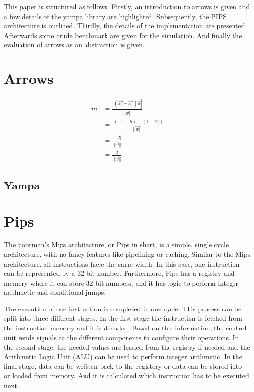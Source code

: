 \documentclass[a4paper,12pt]{article}
\newcommand{\norm}[1]{|| #1 ||}
\begin{document}
This paper is structured as follows. Firstly, an introduction to arrows is
given and a few details of the yampa library are highlighted. Subsequently, the
PIPS architecture is outlined. Thirdly, the details of the implementation are
presented. Afterwards some crude benchmark are given for the simulation. And
finally the evaluation of arrows as an abstraction is given.

\section{Arrows}
\begin{align*}
  m &= \frac{|(\vec{x_0} - \vec{x_1})\vec{w}|}{\norm{\vec{w}}} \\
  &= \frac{|(-1 - b) - (1 -b)|}{\norm{\vec{w}}} \\
  &= \frac{|-2|}{\norm{ \vec{w} }} \\
  &= \frac{2}{ \norm{\vec{w}} } 
\end{align*}

\subsection{Yampa}

\section{Pips}
The poorman's Mips architecture, or Pips in short, is a simple, single cycle
architecture, with no fancy features like pipelining or caching. Similar to the
Mips architecture, all instructions have the same width. In this case, one
instruction can be represented by a 32-bit number. Furthermore, Pips has a
registry and memory where it can store 32-bit numbers, and it has logic to
perform integer arithmetic and conditional jumps.

The execution of one instruction is completed in one cycle. This process can be
split into three different stages. In the first stage the instruction is fetched
from the instruction memory and it is decoded. Based on this information, the
control unit sends signals to the different components to configure their operations. In
the second stage, the needed values are loaded from the registry if needed and the
Arithmetic Logic Unit (ALU) can be used to perform integer arithmetic. In the
final stage, data can be written back to the registery or data can be stored
into or loaded from memory. And it is calculated which instruction has to be
executed next.
\end{document}
